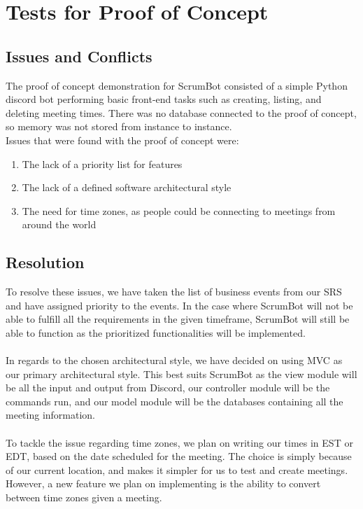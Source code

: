 \documentclass[12pt, titlepage]{article}
\begin{document}
\section{Tests for Proof of Concept}

\subsection{Issues and Conflicts}
The proof of concept demonstration for ScrumBot consisted of a simple Python discord bot performing basic front-end tasks such as creating, listing, and deleting meeting times. There was no database connected to the proof of concept, so memory was not stored from instance to instance.\\
\noindent Issues that were found with the proof of concept were:
\begin{enumerate}
    \item The lack of a priority list for features
    \item The lack of a defined software architectural style
    \item The need for time zones, as people could be connecting to meetings from around the world
\end{enumerate}

\subsection{Resolution}
To resolve these issues, we have taken the list of business events from our SRS and have assigned priority to the events. In the case where ScrumBot will not be able to fulfill all the requirements in the given timeframe, ScrumBot will still be able to function as the prioritized functionalities will be implemented.\\ \\
\noindent In regards to the chosen architectural style, we have decided on using MVC as our primary architectural style. This best suits ScrumBot as the view module will be all the input and output from Discord, our controller module will be the commands run, and our model module will be the databases containing all the meeting information.\\\\
\noindent To tackle the issue regarding time zones, we plan on writing our times in EST or EDT, based on the date scheduled for the meeting. The choice is simply because of our current location, and makes it simpler for us to test and create meetings. However, a new feature we plan on implementing is the ability to convert between time zones given a meeting.
    
\end{document}
